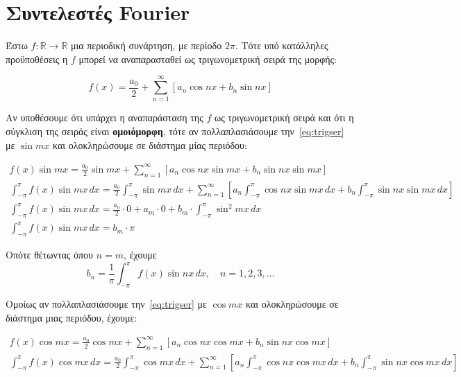 \section{Συντελεστές Fourier}

Έστω $ f \colon \mathbb{R} \to \mathbb{R} $ μια περιοδική συνάρτηση, με περίοδο 
$ 2 \pi $. Τότε υπό κατάλληλες προϋποθέσεις η $f$ μπορεί να αναπαρασταθεί ως 
\textcolor{Col1}{τριγωνομετρική} σειρά της μορφής:

\begin{equation}\label{eq:trigser}
  f(x) = \frac{a_{0}}{2} + \sum_{n=1}^{\infty} [a_{n} \cos{nx}  + b_{n} \sin{nx}]
\end{equation} 

Αν υποθέσουμε ότι υπάρχει η αναπαράσταση της $f$ ως τριγωνομετρική σειρά και ότι 
η σύγκλιση της σειράς είναι \textbf{ομοιόμορφη}, τότε αν πολλαπλασιάσουμε 
την~\eqref{eq:trigser} με $ \sin{mx} $ και ολοκληρώσουμε σε διάστημα μίας περιόδου: 

\begin{gather*}
  f(x) \sin{mx} = \frac{a_{0}}{2} \sin{mx} + \sum_{n=1}^{\infty} 
  [a_{n} \cos{nx} \sin{mx} + b_{n} \sin{nx} \sin{mx}]   \\
  \int _{- \pi} ^{\pi} f(x) \sin{mx} \,{dx} = \frac{a_{0}}{2} \int _{- \pi}^{\pi} 
  \sin{mx} \,{dx} + \sum_{n=1}^{\infty} \left[a_{n} \int _{- \pi}^{\pi} 
    \cos{nx} \sin{mx}  \,{dx} + b_{n} \int _{- \pi }^{\pi} \sin{nx} \sin{mx} 
  \,{dx}\right] \\
  \int _{- \pi }^{\pi} f(x) \sin{mx} \,{dx} = \frac{a_{0}}{2} \cdot 0 + 
  a_{m}\cdot 0 + b_{m} \cdot \int _{- \pi}^{\pi } \sin^{2}{mx} \,{dx} \\
  \int _{- \pi }^{\pi} f(x) \sin{mx} \,{dx} =  b_{m} \cdot \pi 
\end{gather*}   

Οπότε θέτωντας όπου $ n=m $, έχουμε
\begin{equation}\label{eq:four1}
  \boxed{b_{n} = \frac{1}{\pi} \int _{- \pi }^{\pi} f(x) \sin{nx} \,{dx}, \quad n =
  1,2,3, \ldots}
\end{equation} 

Ομοίως αν πολλαπλασιάσουμε την~\eqref{eq:trigser} με $ \cos{mx} $ και ολοκληρώσουμε 
σε διάστημα μιας περιόδου, έχουμε:

\begin{gather*}
  f(x) \cos{mx} = \frac{a_{0}}{2} \cos{mx} + \sum_{n=1}^{\infty} 
  [a_{n} \cos{nx} \cos{mx} + b_{n} \sin{nx} \cos{mx}]   \\
  \int _{- \pi} ^{\pi} f(x) \cos{mx} \,{dx} = \frac{a_{0}}{2} \int _{- \pi}^{\pi} 
  \cos{mx} \,{dx} + \sum_{n=1}^{\infty} \left[a_{n} \int _{- \pi}^{\pi}
    \cos{nx} \cos{mx}  \,{dx} + b_{n} \int _{- \pi }^{\pi} \sin{nx} \cos{mx} 
  \,{dx}\right] \\
\end{gather*}

